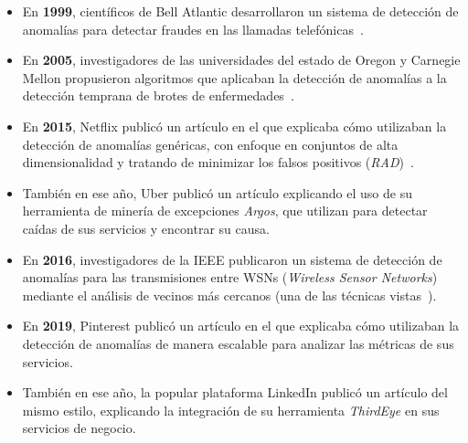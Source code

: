 \begin{itemize}
	\item En \textbf{1999}, científicos de Bell Atlantic desarrollaron un sistema de detección de
		anomalías para detectar fraudes en las llamadas telefónicas~\cite{fawcett1999activity}.
	\item En \textbf{2005}, investigadores de las universidades del estado de Oregon y Carnegie Mellon
		propusieron algoritmos que aplicaban la detección de anomalías a la detección temprana de
		brotes de enfermedades~\cite{wong2005wsare}.
	\item En \textbf{2015}, Netflix publicó un artículo en el que explicaba cómo utilizaban la
		detección de anomalías genéricas, con enfoque en conjuntos de alta dimensionalidad y tratando
		de minimizar los falsos positivos (\emph{RAD})~\cite{netflix2015rad}.
	\item También en ese año, Uber publicó un artículo explicando el uso de su herramienta de minería
		de excepciones \emph{Argos}, que utilizan para detectar caídas de sus servicios y encontrar su
		causa.~\cite{uber2015argos}
	\item En \textbf{2016}, investigadores de la IEEE publicaron un sistema de detección de anomalías
		para las transmisiones entre WSNs (\textit{Wireless Sensor Networks}) mediante el análisis de
		vecinos más cercanos (una de las técnicas vistas~).~\cite{ieee2016wsn}
	\item En \textbf{2019}, Pinterest publicó un artículo en el que explicaba cómo utilizaban la
		detección de anomalías de manera escalable para analizar las métricas de sus
		servicios.~\cite{pinterest2019anomaly}
	\item También en ese año, la popular plataforma LinkedIn publicó un artículo del mismo estilo,
		explicando la integración de su herramienta \textit{ThirdEye} en sus servicios de
		negocio.~\cite{linkedin2019thirdeye}
\end{itemize}
